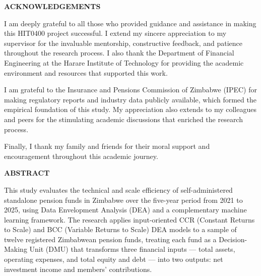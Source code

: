 \documentclass[12pt,a4paper]{article}
\begin{document}
\newpage

\begin{center}
    {\LARGE\bfseries ACKNOWLEDGEMENTS}
\end{center}
\vspace{1cm}

I am deeply grateful to all those who provided guidance and assistance in making this HIT0400 project successful. I extend my sincere appreciation to my supervisor for the invaluable mentorship, constructive feedback, and patience throughout the research process. I also thank the Department of Financial Engineering at the Harare Institute of Technology for providing the academic environment and resources that supported this work.

I am grateful to the Insurance and Pensions Commission of Zimbabwe (IPEC) for making regulatory reports and industry data publicly available, which formed the empirical foundation of this study. My appreciation also extends to my colleagues and peers for the stimulating academic discussions that enriched the research process.

Finally, I thank my family and friends for their moral support and encouragement throughout this academic journey.

\newpage

\tableofcontents
\newpage

\listoffigures
{}
\newpage

\listoftables
{}
\newpage

\begin{center}
    {\LARGE\bfseries ABSTRACT}
\end{center}
\vspace{1cm}

This study evaluates the technical and scale efficiency of self-administered standalone pension funds in Zimbabwe over the five-year period from 2021 to 2025, using Data Envelopment Analysis (DEA) and a complementary machine learning framework. The research applies input-oriented CCR (Constant Returns to Scale) and BCC (Variable Returns to Scale) DEA models to a sample of twelve registered Zimbabwean pension funds, treating each fund as a Decision-Making Unit (DMU) that transforms three financial inputs --- total assets, operating expenses, and total equity and debt --- into two outputs: net investment income and members' contributions.
\end{document}
